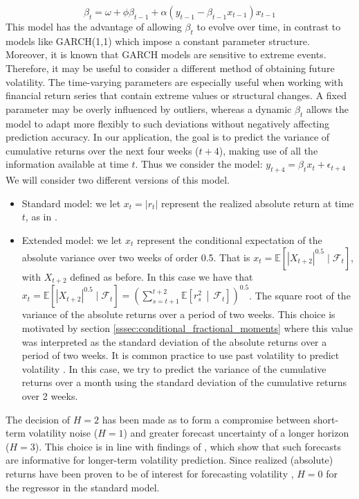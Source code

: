 \begin{equation}
    \beta_t = \omega + \phi \beta_{t-1} + \alpha(y_{t-1} - \beta_{t-1} x_{t-1})x_{t-1}
\end{equation}
 This model has the advantage of allowing \(\beta_t\) to evolve over time, in contrast to models like GARCH(1,1) which impose a constant parameter structure. Moreover, it is known that GARCH models are sensitive to extreme events. Therefore, it may be useful to consider a different method of obtaining future volatility. The time-varying parameters are especially useful when working with financial return series that contain extreme values or structural changes. A fixed parameter may be overly influenced by outliers, whereas a dynamic \(\beta_t\) allows the model to adapt more flexibly to such deviations without negatively affecting prediction accuracy. In our application, the goal is to predict the variance of cumulative returns over the next four weeks (\(t + 4\)), making use of all the information available at time \(t\).  Thus we consider the model: \( \displaystyle y_{t+4} = \beta_t x_t + \epsilon_{t+4}\) We will consider two different versions of this model.
\begin{itemize}
    \item Standard model: we let \(x_t = |r_t|\) represent the realized absolute return at time \(t\), as in \citet{taylor2007}.
    \item Extended model: we let \(x_t\) represent the conditional expectation of the absolute variance over two weeks of order 0.5. That is \(x_t = \mathbb{E}[|X_{t + 2}|^{0.5} \mid \mathcal{F}_t]\), with \(X_{t + 2}\) defined as before. In this case we have that \(x_t = \mathbb{E}[|X_{t + 2}|^{0.5} \mid \mathcal{F}_t] = \left( \sum_{s = t+1}^{t+2} \mathbb{E}\left[ r_s^2 \,\middle|\, \mathcal{F}_t \right] \right)^{0.5}\). The square root of the variance of the absolute returns over a period of two weeks. This choice is motivated by section \ref{sssec:conditional_fractional_moments} where this value was interpreted as the standard deviation of the absolute returns over a period of two weeks. It is common practice to use past volatility to predict volatility \citep{poon2003}. In this case, we try to predict the variance of the cumulative returns over a month using the standard deviation of the cumulative returns over 2 weeks.
\end{itemize}
The decision of \(H = 2\) has been made as to form a compromise between short-term volatility noise (\(H = 1\)) and greater forecast uncertainty of a longer horizon (\(H = 3\)). This choice is in line with findings of \citet{andersen1998}, which show that such forecasts are informative for longer-term volatility prediction. Since realized (absolute) returns have been proven to be of interest for forecasting volatility \citep{taylor2007}, \(H = 0\) for the regressor in the standard model.
